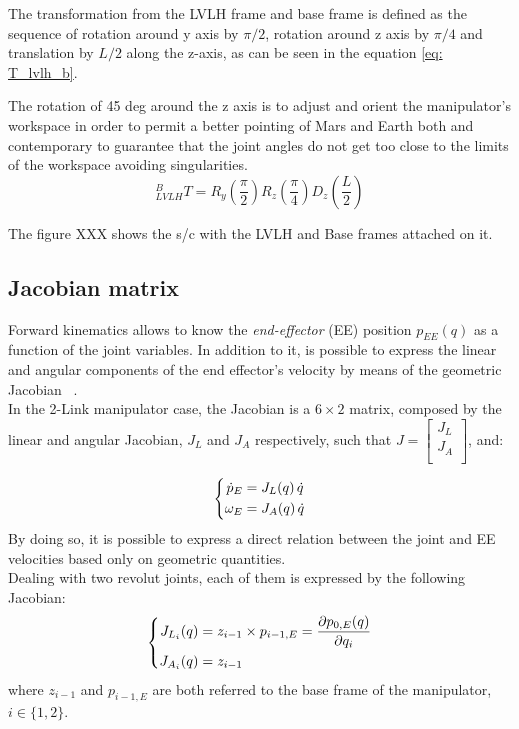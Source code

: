 The transformation from the LVLH frame and base frame is defined as the sequence of rotation around y axis by $\pi/2$, rotation around z axis by $\pi/4$ and translation by $L/2$ along the z-axis, as can be seen in the equation \ref{eq: T_lvlh_b}.\

The rotation of 45 deg around the z axis is to adjust and orient the manipulator's workspace in order to permit a better pointing of Mars and Earth both and contemporary to guarantee that the joint angles do not get too close to the limits of the workspace avoiding singularities.
\begin{equation}
  ^{B}_{LVLH}T = R_{y}\left(\dfrac{\pi}{2}\right) R_{z}\left(\dfrac{\pi}{4}\right) D_{z}\left(\dfrac{L}{2}\right)  
  \label{eq: T_lvlh_b}
\end{equation}

The figure XXX shows the s/c with the LVLH and Base frames attached on it.



\subsection{Jacobian matrix}
Forward kinematics allows to know the \textit{end-effector} (EE) position $p_{EE}(q)$ as a function of the joint variables. In addition to it, is possible to express the linear and angular components of the end effector's velocity by means of the geometric Jacobian ~. \\In the 2-Link manipulator case, the Jacobian is a $6\times{2}$ matrix, composed by the linear and angular Jacobian, $J_L$ and $J_A$ respectively, such that 
$J = \begin{bmatrix}
J_L\\
J_A\\
\end{bmatrix}$, and:

\begin{equation}
    \centering
    \left\{\begin{split} 
      \dot{p}_E &= J_L(q)\,\dot{q}  \\
      \omega_E &= J_A(q)\,\dot{q}
      \end{split}\right.
\end{equation}
\break
By doing so, it is possible to express a direct relation between the joint and EE velocities based only on geometric quantities. \\Dealing with two revolut joints, each of them is expressed by the following Jacobian:
\begin{equation}
    \centering
    \left\{\begin{split} 
     J_{L_i}(q) &=  z_{i-1}\times{p_{i-1,E}} = \dfrac{\partial{p_{0,E}(q)}}{\partial{q_i}} \\
     J_{A_i}(q) &= z_{i-1}
     \end{split}\right.
\end{equation}
where $z_{i-1}$ and $p_{i-1,E}$ are both referred to the base frame of the manipulator, $i \in \{1,2\}$.\\

